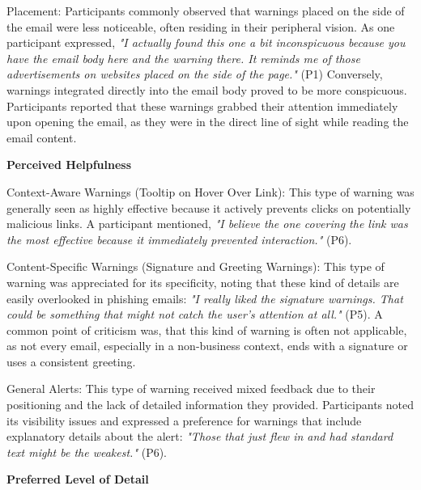 \documentclass[
  a4paper,  %
  twoside,  %
  bibliography=totoc,
  headsepline,
  cleardoublepage=empty,
  parskip=half,
  draft=false
]{scrbook}
\begin{document}
Placement: Participants commonly observed that warnings placed on the side of the email were less noticeable, often residing in their peripheral vision. As one participant expressed, \textit{"I actually found this one a bit inconspicuous because you have the email body here and the warning there. It reminds me of those advertisements on websites placed on the side of the page."} (P1) Conversely, warnings integrated directly into the email body proved to be more conspicuous. Participants reported that these warnings grabbed their attention immediately upon opening the email, as they were in the direct line of sight while reading the email content. 


\textbf{Perceived Helpfulness}

Context-Aware Warnings (Tooltip on Hover Over Link): This type of warning was generally seen as highly effective because it actively prevents clicks on potentially malicious links. A participant mentioned, \textit{"I believe the one covering the link was the most effective because it immediately prevented interaction."} (P6).
    
Content-Specific Warnings (Signature and Greeting Warnings): This type of warning was appreciated for its specificity, noting that these kind of details are easily overlooked in phishing emails: \textit{"I really liked the signature warnings. That could be something that might not catch the user’s attention at all."} (P5). A common point of criticism was, that this kind of warning is often not applicable, as not every email, especially in a non-business context, ends with a signature or uses a consistent greeting.
      
General Alerts: This type of warning received mixed feedback due to their positioning and the lack of detailed information they provided. Participants noted its visibility issues and expressed a preference for warnings that include explanatory details about the alert: \textit{"Those that just flew in and had standard text might be the weakest."} (P6). 

\textbf{Preferred Level of Detail}
\end{document}
